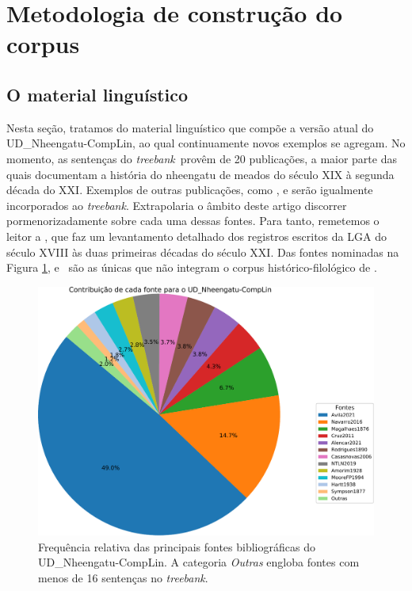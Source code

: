 \documentclass[portuguese]{textolivre}
\newcommand{\tbc}{UD\_Nheengatu-CompLin}
\newcommand{\tb}{\textit{treebank}}
\newcommand{\vum}{\textcite{alencar2021}}
\begin{document}
\section{Metodologia de construção do corpus}\label{sec:metodologia}

\subsection{O material linguístico}\label{subsec:material}

Nesta seção, tratamos do material linguístico que compõe a versão atual do \tbc, ao qual continuamente novos exemplos se agregam. No momento, as sentenças do \tb~provêm de 20 publicações, a maior parte das quais documentam a história do nheengatu de meados do século XIX à segunda década do XXI. Exemplos de outras publicações, como \textcite{goes2015novo}, \textcite{Avila2016} e \textcite{Trevisan2017} serão igualmente incorporados ao \tb. Extrapolaria o âmbito deste artigo discorrer pormenorizadamente sobre cada uma dessas fontes. Para tanto, remetemos o leitor a \textcite{avila2021}, que faz um levantamento detalhado dos registros escritos da LGA do século XVIII às duas primeiras décadas do século XXI. Das fontes nominadas na Figura \ref{fig:freqsources}, \textcite{moore-facundes-pires-1994} e \vum~são as únicas que não integram o corpus histórico-filológico de \textcite{avila2021}.  

\begin{figure}[htbp]
  \centering
  \begin{minipage}{.8\textwidth}
    \includegraphics[width=\linewidth]{figures/FreqSources16NTB.pdf}
    \caption{Frequência relativa das principais fontes bibliográficas do \tbc. A categoria \textit{Outras} engloba fontes com menos de 16 sentenças no \tb.}
    \label{fig:freqsources}
  \end{minipage}
\end{figure}
\end{document}
